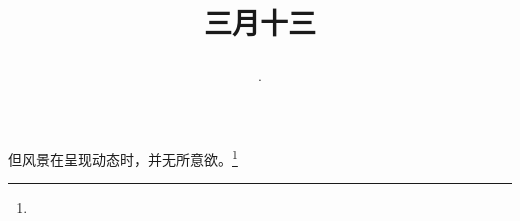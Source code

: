 \title{\date[d=21,m=4,y=2024][year:cn-y,年,month:cn,day:cn,日,·,weekday]·三月十三 }
但风景在呈现动态时，并无所意欲。\footnote{ }

